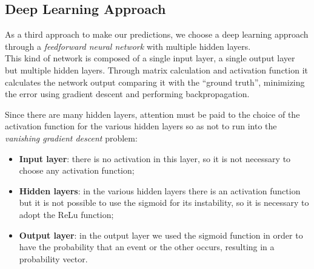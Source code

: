 \subsection{Deep Learning Approach}
As a third approach to make our predictions, we choose a deep learning approach through a \textit{feedforward neural network} with multiple hidden layers.\\
This kind of network is composed of a single input layer, a single output layer but multiple hidden layers. Through matrix calculation and activation function it calculates the network output comparing it with the ``ground truth'', minimizing the error using gradient descent and performing backpropagation.

Since there are many hidden layers, attention must be paid to the choice of the activation function for the various hidden layers so as not to run into the \textit{vanishing gradient descent} problem:
\begin{itemize}
\item \textbf{Input layer}: there is no activation in this layer, so it is not necessary to choose any activation function;
\item \textbf{Hidden layers}: in the various hidden layers there is an activation function but it is not possible to use the sigmoid for its instability, so it is necessary to adopt the ReLu function;
\item \textbf{Output layer}: in the output layer we used the sigmoid function in order to have the probability that an event or the other occurs, resulting in a probability vector.
\end{itemize}

